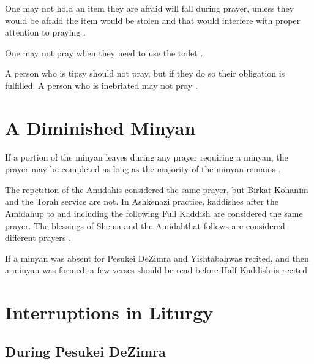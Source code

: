 \documentclass[11pt]{article}
\newcommand{\heth}{\d{h}}
\newcommand{\amidah}{Amidah\space}
\begin{document}
One may not hold an item they are afraid will fall during prayer, unless they would be afraid the item would be stolen and that would interfere with proper attention to praying \parencite[5:7 citing OC 96]{PH}.

One may not pray when they need to use the toilet \parencite*[5:8 citing Berakhot 15a]{PH}.

A person who is tipsy should not pray, but if they do so their obligation is fulfilled.  A person who is inebriated may not pray \parencite*[5:11 citing OC 99]{PH}.

\section{A Diminished Minyan}

If a portion of the minyan leaves during any prayer requiring a minyan, the prayer may be completed as long as the majority of the minyan remains  \parencite*[2:10 citing OC 55]{PH}.

The repetition of the \amidah is considered the same prayer, but Birkat Kohanim and the Torah service are not. In Ashkenazi practice, kaddishes after the \amidah up to and including the following Full Kaddish are considered the same prayer. The blessings of Shema and the \amidah that follows are considered different prayers \parencite*{PH}.

If a minyan was absent for Pesukei DeZimra and Yishtaba\heth\space was recited, and then a minyan was formed, a few verses should be read before Half Kaddish is recited \parencite*[15:1]{Kitzur}

\section{Interruptions in Liturgy}

\subsection{During Pesukei DeZimra}
\end{document}
